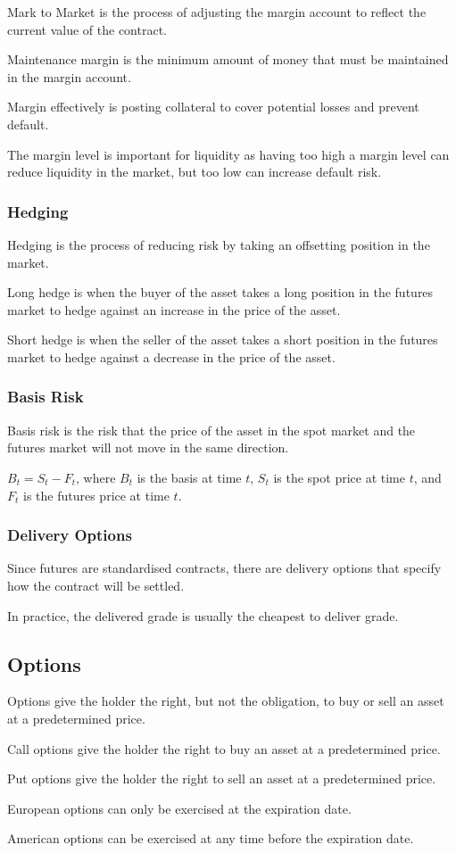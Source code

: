 Mark to Market is the process of adjusting the margin account to reflect the current value of the contract.

Maintenance margin is the minimum amount of money that must be maintained in the margin account.

Margin effectively is posting collateral to cover potential losses and prevent default.

The margin level is important for liquidity as having too high a margin level can reduce liquidity in the market, but too low can increase default risk.

\subsubsection{Hedging}
Hedging is the process of reducing risk by taking an offsetting position in the market.

Long hedge is when the buyer of the asset takes a long position in the futures market to hedge against an increase in the price of the asset.

Short hedge is when the seller of the asset takes a short position in the futures market to hedge against a decrease in the price of the asset.

\subsubsection{Basis Risk}
Basis risk is the risk that the price of the asset in the spot market and the futures market will not move in the same direction.

$B_t = S_t - F_t$, where $B_t$ is the basis at time $t$, $S_t$ is the spot price at time $t$, and $F_t$ is the futures price at time $t$.

\subsubsection{Delivery Options}
Since futures are standardised contracts, there are delivery options that specify how the contract will be settled.

In practice, the delivered grade is usually the cheapest to deliver grade.


\subsection{Options}
Options give the holder the right, but not the obligation, to buy or sell an asset at a predetermined price.

Call options give the holder the right to buy an asset at a predetermined price.

Put options give the holder the right to sell an asset at a predetermined price.

European options can only be exercised at the expiration date.

American options can be exercised at any time before the expiration date.


